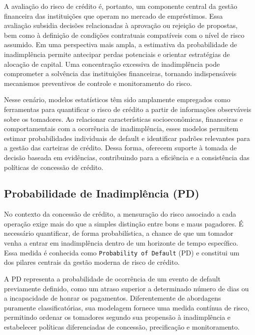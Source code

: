 \documentclass[
  brazilian,
  12pt,
  letterpaper,
  DIV=11,
  numbers=noendperiod]{scrartcl}
\begin{document}
A avaliação do risco de crédito é, portanto, um componente central da
gestão financeira das instituições que operam no mercado de empréstimos.
Essa avaliação subsidia decisões relacionadas à aprovação ou rejeição de
propostas, bem como à definição de condições contratuais compatíveis com
o nível de risco assumido. Em uma perspectiva mais ampla, a estimativa
da probabilidade de inadimplência permite antecipar perdas potenciais e
orientar estratégias de alocação de capital. Uma concentração excessiva
de inadimplência pode comprometer a solvência das instituições
financeiras, tornando indispensáveis mecanismos preventivos de controle
e monitoramento do risco.

Nesse cenário, modelos estatísticos têm sido amplamente empregados como
ferramentas para quantificar o risco de crédito a partir de informações
observáveis sobre os tomadores. Ao relacionar características
socioeconômicas, financeiras e comportamentais com a ocorrência de
inadimplência, esses modelos permitem estimar probabilidades individuais
de default e identificar padrões relevantes para a gestão das carteiras
de crédito. Dessa forma, oferecem suporte à tomada de decisão baseada em
evidências, contribuindo para a eficiência e a consistência das
políticas de concessão de crédito.

\subsection{Probabilidade de Inadimplência
(PD)}\label{probabilidade-de-inadimpluxeancia-pd}

No contexto da concessão de crédito, a mensuração do risco associado a
cada operação exige mais do que a simples distinção entre bons e maus
pagadores. É necessário quantificar, de forma probabilística, a chance
de que um tomador venha a entrar em inadimplência dentro de um horizonte
de tempo específico. Essa medida é conhecida como
\texttt{Probability\ of\ Default} (PD) e constitui um dos pilares
centrais da gestão moderna de risco de crédito.

A PD representa a probabilidade de ocorrência de um evento de default
previamente definido, como um atraso superior a determinado número de
dias ou a incapacidade de honrar os pagamentos. Diferentemente de
abordagens puramente classificatórias, sua modelagem fornece uma medida
contínua de risco, permitindo ordenar os tomadores segundo sua propensão
à inadimplência e estabelecer políticas diferenciadas de concessão,
precificação e monitoramento.
\end{document}
